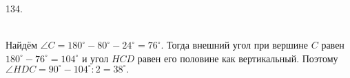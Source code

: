 134. \begin{figure}[ht!]
\end{figure}\\
Найдём $\angle C=180^\circ-80^\circ-24^\circ=76^\circ.$ Тогда внешний угол при вершине $C$ равен $180^\circ-76^\circ=104^\circ$ и угол $HCD$ равен его половине как вертикальный. Поэтому $\angle HDC=90^\circ-104^\circ:2=38^\circ.$\newpage\noindent
